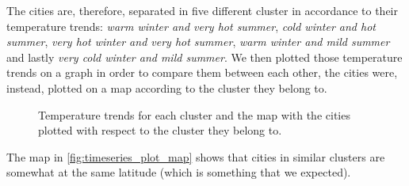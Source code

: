 The cities are, therefore, separated in five different cluster in accordance to their temperature trends: \textit{warm winter and very hot summer}, \textit{cold winter and hot summer}, \textit{very hot winter and very hot summer}, \textit{warm winter and mild summer} and lastly \textit{very cold winter and mild summer}.
We then plotted those temperature trends on a graph in order to compare them between each other, the cities were, instead, plotted on a map according to the cluster they belong to.
\begin{figure}[H]
    \centering
    \caption{Temperature trends for each cluster and the map with the cities plotted with respect to the cluster they belong to.}
    \label{fig:timeseries_plot_map}
\end{figure}
The map in \autoref{fig:timeseries_plot_map} shows that cities in similar clusters are somewhat at the same latitude (which is something that we expected).

